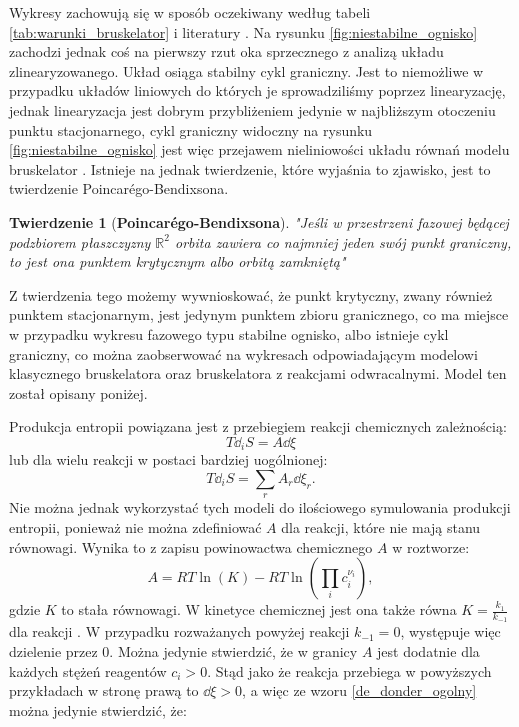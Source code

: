 \documentclass[10pt, a4paper, twoside, onecolumn]{article}
\numberwithin{equation}{section}
\newtheorem*{theorem}{Twierdzenie}
\begin{document}
	Wykresy zachowują się w sposób oczekiwany według tabeli \ref{tab:warunki_bruskelator} i literatury \cite{orlik}. Na rysunku \ref{fig:niestabilne_ognisko} zachodzi jednak coś na pierwszy rzut oka sprzecznego z analizą układu zlinearyzowanego. Układ osiąga stabilny cykl graniczny. Jest to niemożliwe w przypadku układów liniowych do których je sprowadziliśmy poprzez linearyzację, jednak linearyzacja jest dobrym przybliżeniem jedynie w najbliższym otoczeniu punktu stacjonarnego, cykl graniczny widoczny na rysunku \ref{fig:niestabilne_ognisko} jest więc przejawem nieliniowości układu równań modelu bruskelator \cite{orlik}. Istnieje na jednak twierdzenie, które wyjaśnia to zjawisko, jest to twierdzenie Poincar\'{e}go-Bendixsona. \par
	\begin{theorem}[\textbf{Poincar\'{e}go-Bendixsona}]
		"Jeśli w przestrzeni fazowej będącej podzbiorem płaszczyzny \(\mathbb{R}^{2}\) orbita zawiera co najmniej jeden swój punkt graniczny, to jest ona punktem krytycznym albo orbitą zamkniętą" \cite{palczewski}
	\end{theorem}
	Z twierdzenia tego możemy wywnioskować, że punkt krytyczny, zwany również punktem stacjonarnym, jest jedynym punktem zbioru granicznego, co ma miejsce w przypadku wykresu fazowego typu stabilne ognisko, albo istnieje cykl graniczny, co można zaobserwować na wykresach odpowiadającym modelowi klasycznego bruskelatora oraz bruskelatora z reakcjami odwracalnymi. Model ten został opisany poniżej. \par
	Produkcja entropii powiązana jest z przebiegiem reakcji chemicznych zależnością:
	\begin{equation}\label{de_donder}
		T\dd_{i}S=A\dd{\xi}
	\end{equation}
	lub dla wielu reakcji w postaci bardziej uogólnionej: 
	\begin{equation}\label{de_donder_ogolny}
		T\dd_{i}S=\sum_{r}A_{r}\dd{\xi_{r}}.
	\end{equation}
	Nie można jednak wykorzystać tych modeli do ilościowego symulowania produkcji entropii, ponieważ nie można zdefiniować \(A\) dla reakcji, które nie mają stanu równowagi. Wynika to z zapisu powinowactwa chemicznego \(A\) w roztworze:
	\begin{equation}
		A = RT\ln(K) - RT\ln(\prod_{i}c_{i}^{\nu_{i}}), 
	\end{equation}
	gdzie \(K\) to stała równowagi. W kinetyce chemicznej jest ona także równa \(K = \frac{k_{1}}{k_{-1}}\) dla reakcji . W przypadku rozważanych powyżej reakcji \(k_{-1}=0\), występuje więc dzielenie przez \(0\). Można jedynie stwierdzić, że w granicy \(A\) jest dodatnie dla każdych stężeń reagentów \(c_{i}>0\). Stąd jako że reakcja przebiega w powyższych przykładach w stronę prawą to \(\dd{\xi}>0\), a więc ze wzoru \eqref{de_donder_ogolny} można jedynie stwierdzić, że:
\end{document}
